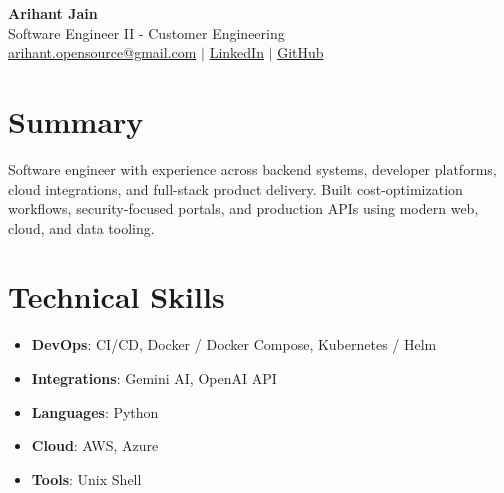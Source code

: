 \documentclass[11pt,a4paper]{article}
\begin{document}
\begin{center}
{\LARGE \textbf{Arihant Jain}}
\\ Software Engineer II - Customer Engineering
\\ \href{mailto:arihant.opensource@gmail.com}{arihant.opensource@gmail.com} $\mid$ \href{https://linkedin.com/in/arihantjain1208}{LinkedIn} $\mid$ \href{https://github.com/Arihant1208}{GitHub}
\end{center}

\section{Summary}
Software engineer with experience across backend systems, developer platforms, cloud integrations, and full-stack product delivery. Built cost-optimization workflows, security-focused portals, and production APIs using modern web, cloud, and data tooling.

\section{Technical Skills}
\begin{itemize}
  \item \textbf{DevOps}: CI/CD, Docker / Docker Compose, Kubernetes / Helm
  \item \textbf{Integrations}: Gemini AI, OpenAI API
  \item \textbf{Languages}: Python
  \item \textbf{Cloud}: AWS, Azure
  \item \textbf{Tools}: Unix Shell
\end{itemize}
\end{document}
